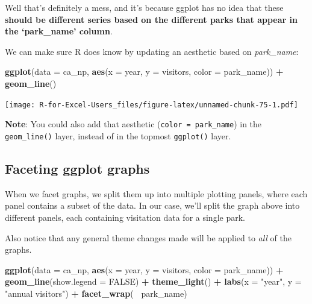 \documentclass[]{book}
\newenvironment{Shaded}{\begin{snugshade}}{\end{snugshade}}
\newcommand{\DataTypeTok}[1]{\textcolor[rgb]{0.13,0.29,0.53}{#1}}
\newcommand{\KeywordTok}[1]{\textcolor[rgb]{0.13,0.29,0.53}{\textbf{#1}}}
\newcommand{\NormalTok}[1]{#1}
\newcommand{\OperatorTok}[1]{\textcolor[rgb]{0.81,0.36,0.00}{\textbf{#1}}}
\newcommand{\OtherTok}[1]{\textcolor[rgb]{0.56,0.35,0.01}{#1}}
\newcommand{\StringTok}[1]{\textcolor[rgb]{0.31,0.60,0.02}{#1}}
\begin{document}
Well that's definitely a mess, and it's because ggplot has no idea that these \textbf{should be different series based on the different parks that appear in the `park\_name' column}.

We can make sure R does know by updating an aesthetic based on \emph{park\_name}:

\begin{Shaded}
\begin{Highlighting}[]
\KeywordTok{ggplot}\NormalTok{(}\DataTypeTok{data =}\NormalTok{ ca_np, }\KeywordTok{aes}\NormalTok{(}\DataTypeTok{x =}\NormalTok{ year, }\DataTypeTok{y =}\NormalTok{ visitors, }\DataTypeTok{color =}\NormalTok{ park_name)) }\OperatorTok{+}
\StringTok{  }\KeywordTok{geom_line}\NormalTok{()}
\end{Highlighting}
\end{Shaded}

\texttt{[image: R-for-Excel-Users\_files/figure-latex/unnamed-chunk-75-1.pdf]}

\textbf{Note}: You could also add that aesthetic (\texttt{color\ =\ park\_name}) in the \texttt{geom\_line()} layer, instead of in the topmost \texttt{ggplot()} layer.

\hypertarget{faceting-ggplot-graphs}{%
\subsection{Faceting ggplot graphs}\label{faceting-ggplot-graphs}}

When we facet graphs, we split them up into multiple plotting panels, where each panel contains a subset of the data. In our case, we'll split the graph above into different panels, each containing visitation data for a single park.

Also notice that any general theme changes made will be applied to \emph{all} of the graphs.

\begin{Shaded}
\begin{Highlighting}[]
\KeywordTok{ggplot}\NormalTok{(}\DataTypeTok{data =}\NormalTok{ ca_np, }\KeywordTok{aes}\NormalTok{(}\DataTypeTok{x =}\NormalTok{ year, }\DataTypeTok{y =}\NormalTok{ visitors, }\DataTypeTok{color =}\NormalTok{ park_name)) }\OperatorTok{+}
\StringTok{  }\KeywordTok{geom_line}\NormalTok{(}\DataTypeTok{show.legend =} \OtherTok{FALSE}\NormalTok{) }\OperatorTok{+}
\StringTok{  }\KeywordTok{theme_light}\NormalTok{() }\OperatorTok{+}\StringTok{ }
\StringTok{  }\KeywordTok{labs}\NormalTok{(}\DataTypeTok{x =} \StringTok{"year"}\NormalTok{, }\DataTypeTok{y =} \StringTok{"annual visitors"}\NormalTok{) }\OperatorTok{+}
\StringTok{  }\KeywordTok{facet_wrap}\NormalTok{(}\OperatorTok{~}\StringTok{ }\NormalTok{park_name)}
\end{Highlighting}
\end{Shaded}
\end{document}
